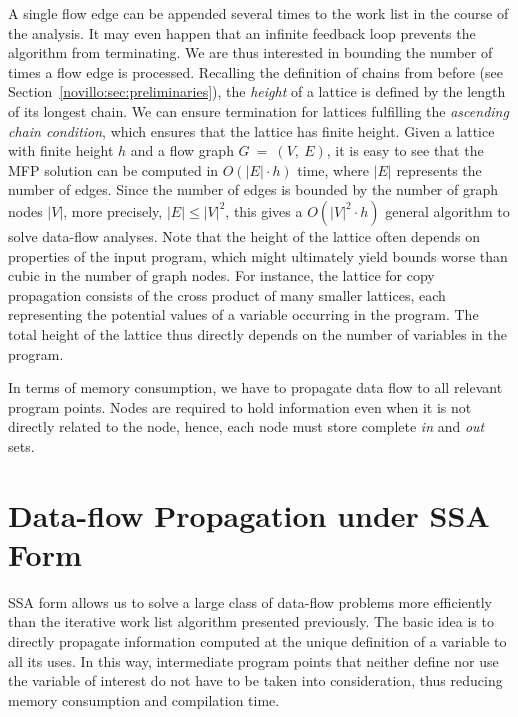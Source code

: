 A single flow edge can be appended several times to the
work list in the course of the analysis. It may even happen that an infinite
feedback loop prevents the algorithm from terminating. We are thus interested in
bounding the number of times a flow edge is processed. Recalling the definition
of chains from before (see Section~\ref{novillo:sec:preliminaries}),
 the \emph{height} of a
lattice is defined by the length of its longest chain. We can ensure termination
for lattices fulfilling the \emph{ascending chain condition}, which ensures that
the lattice has finite height. Given a lattice with finite height $h$ and a flow
graph $G~=~(V,~E)$, it is easy to see that the MFP solution can be computed in
$O(|E| \cdot h)$ time, where $|E|$ represents the number of edges. Since the
number of edges is bounded by the number of graph nodes $|V|$, more precisely,
$|E| \leq |V|^2$, this gives a $O(|V|^2 \cdot h)$ general algorithm to
solve data-flow analyses. Note that the height of
the lattice often depends on properties of the input program, which might
ultimately yield bounds worse than cubic in the number of graph nodes. For
instance, the lattice for copy propagation consists of the cross product of many
smaller lattices, each representing the potential values of a variable occurring
in the program. The total height of the lattice thus directly depends on the
number of variables in the program.

In terms of memory consumption, we have to propagate data flow to all relevant
program points. Nodes are required to hold information even when it
is not directly related to the node, hence, each node must store complete 
\emph{in} and \emph{out} sets.


\section{Data-flow Propagation under SSA Form}
\label{cpeasier:sec:prop-engine}

SSA form allows us to solve a large class of data-flow problems more efficiently
than the iterative work list algorithm presented previously.
The basic idea is to directly propagate information computed at the unique
definition of a variable to all its uses. In this way, intermediate program
points that neither define nor use the variable of interest do not have to
be taken into consideration, thus reducing memory consumption
and compilation time.

